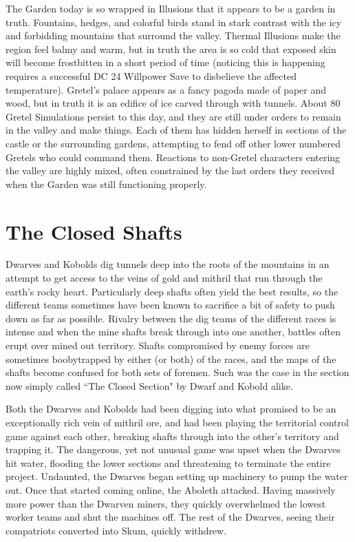 The Garden today is so wrapped in Illusions that it appears to be a garden in truth. Fountains, hedges, and colorful birds stand in stark contrast with the icy and forbidding mountains that surround the valley. Thermal Illusions make the region feel balmy and warm, but in truth the area is so cold that exposed skin will become frostbitten in a short period of time (noticing this is happening requires a successful DC 24 Willpower Save to disbelieve the affected temperature). Gretel's palace appears as a fancy pagoda made of paper and wood, but in truth it is an edifice of ice carved through with tunnels. About 80 Gretel Simulations persist to this day, and they are still under orders to remain in the valley and make things. Each of them has hidden herself in sections of the castle or the surrounding gardens, attempting to fend off other lower numbered Gretels who could command them. Reactions to non-Gretel characters entering the valley are highly mixed, often constrained by the last orders they received when the Garden was still functioning properly.

\section{The Closed Shafts}

Dwarves and Kobolds dig tunnels deep into the roots of the mountains in an attempt to get access to the veins of gold and mithril that run through the earth's rocky heart. Particularly deep shafts often yield the best results, so the different teams sometimes have been known to sacrifice a bit of safety to push down as far as possible. Rivalry between the dig teams of the different races is intense and when the mine shafts break through into one another, battles often erupt over mined out territory. Shafts compromised by enemy forces are sometimes boobytrapped by either (or both) of the races, and the maps of the shafts become confused for both sets of foremen. Such was the case in the section now simply called ``The Closed Section" by Dwarf and Kobold alike.

Both the Dwarves and Kobolds had been digging into what promised to be an exceptionally rich vein of mithril ore, and had been playing the territorial control game against each other, breaking shafts through into the other's territory and trapping it. The dangerous, yet not unusual game was upset when the Dwarves hit water, flooding the lower sections and threatening to terminate the entire project. Undaunted, the Dwarves began setting up machinery to pump the water out. Once that started coming online, the Aboleth attacked. Having massively more power than the Dwarven miners, they quickly overwhelmed the lowest worker teams and shut the machines off. The rest of the Dwarves, seeing their compatriots converted into Skum, quickly withdrew.

